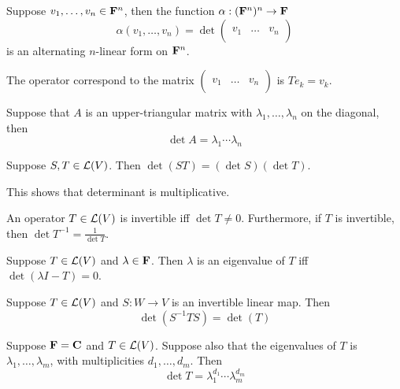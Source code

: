 \documentclass[12pt,a4paper]{article}
\begin{document}
    \begin{prop}
        Suppose $v_1,\dots,v_n\in\mathbf{F}^n$, then the function $\alpha:(\mathbf{F}^{n})^n\to\mathbf{F}$
        $$
        \alpha(v_1,\dots,v_n)=\det \begin{pmatrix}&&\\v_1&\dots&v_n\\&&\end{pmatrix}
        $$
        is an alternating $n$-linear form on $\mathbf{F}^n$.
    \end{prop}
    \begin{remark}
        The operator correspond to the matrix $\begin{pmatrix}&&\\v_1&\dots&v_n\\&&\end{pmatrix}$ is $Te_k=v_k$.
    \end{remark}
    \hfill

    \begin{eg}
        Suppose that $A$ is an upper-triangular matrix with $\lambda_1,\dots,\lambda_n$ on the diagonal, then 
        $$
        \det A=\lambda_1\cdots\lambda_n
        $$
    \end{eg}
    \hfill

    \begin{prop}
        Suppose $S,T\in\mathcal{L}(V)$. Then $\det(ST)=(\det S)(\det T)$.
    \end{prop}
    \begin{remark}
        This shows that determinant is multiplicative.
    \end{remark}
    \begin{cor}
        An operator $T\in\mathcal{L}(V)$ is invertible iff $\det T\neq0$. Furthermore, if $T$ is invertible, then $\det T^{-1}=\frac{1}{\det T}$.
    \end{cor}
    \hfill

    \begin{prop}
        Suppose $T\in\mathcal{L}(V)$ and $\lambda\in\mathbf{F}$. Then $\lambda$ is an eigenvalue of $T$ iff $\det(\lambda I-T)=0$.
    \end{prop}
    \hfill

    \begin{prop}
        Suppose $T\in\mathcal{L}(V)$ and $S:W\to V$ is an invertible linear map. Then
        $$
        \det(S^{-1}TS)=\det(T)
        $$
    \end{prop}
    \hfill

    \begin{prop}
        Suppose $\mathbf{F}=\mathbf{C}$ and $T\in\mathcal{L}(V)$. Suppose also that the eigenvalues of $T$ is $\lambda_1,\dots,\lambda_m$, with multiplicities $d_1,\dots,d_m$. Then
        $$
        \det T=\lambda_1^{d_1}\cdots\lambda_m^{d_m}
        $$
    \end{prop}
    \hfill
\end{document}
